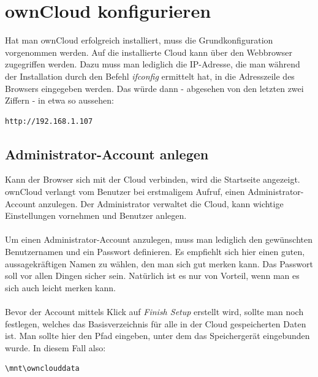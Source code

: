 \section{ownCloud konfigurieren}
Hat man ownCloud erfolgreich installiert, muss die Grundkonfiguration vorgenommen werden. Auf die installierte Cloud kann über den Webbrowser zugegriffen werden. Dazu muss man lediglich die IP-Adresse, die man während der Installation durch den Befehl \textit{ifconfig} ermittelt hat, in die Adresszeile des Browsers eingegeben werden. Das würde dann - abgesehen von den letzten zwei Ziffern - in etwa so aussehen:

\begin{lstlisting}
http://192.168.1.107
\end{lstlisting}

\subsection{Administrator-Account anlegen}
Kann der Browser sich mit der Cloud verbinden, wird die Startseite angezeigt. ownCloud verlangt vom Benutzer bei erstmaligem Aufruf, einen Administrator-Account anzulegen. Der Administrator verwaltet die Cloud, kann wichtige Einstellungen vornehmen und Benutzer anlegen.
\\
\\
Um einen Administrator-Account anzulegen, muss man lediglich den gewünschten Benutzernamen und ein Passwort definieren. Es empfiehlt sich hier einen guten, aussagekräftigen Namen zu wählen, den man sich gut merken kann. Das Passwort soll vor allen Dingen sicher sein. Natürlich ist es nur von Vorteil, wenn man es sich auch leicht merken kann.
\\
\\
Bevor der Account mittels Klick auf \textit{Finish Setup} erstellt wird, sollte man noch festlegen, welches das Basisverzeichnis für alle in der Cloud gespeicherten Daten ist. Man sollte hier den Pfad eingeben, unter dem das Speichergerät eingebunden wurde. In diesem Fall also:

\begin{lstlisting}
\mnt\ownclouddata
\end{lstlisting}

